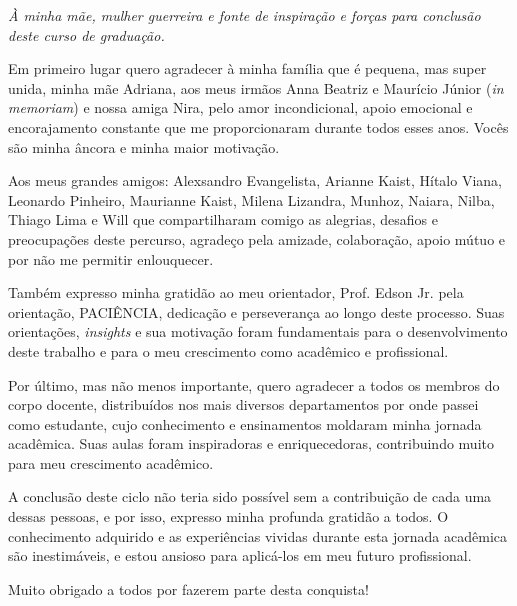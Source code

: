 \documentclass[
	12pt,			%
	openright,		%
	oneside,	
	a4paper,		%
	english,		%
	brazil			%
]{abntex2/abntex2}  %
\begin{document}
	\begin{dedicatoria}
		
		\vspace*{\fill}
		\noindent
		\leftskip=7cm
		\textit{À minha mãe, mulher guerreira e fonte de inspiração e forças para conclusão deste curso de graduação.}
		\vspace{5cm}
	
	\end{dedicatoria}

	\begin{agradecimentos}

		Em primeiro lugar quero agradecer à minha família que é pequena, mas super unida, minha mãe Adriana, aos meus irmãos Anna Beatriz e Maurício Júnior (\textit{in memoriam}) e nossa amiga Nira, pelo amor incondicional, apoio emocional e encorajamento constante que me proporcionaram durante todos esses anos. Vocês são minha âncora e minha maior motivação.
		
		Aos meus grandes amigos: Alexsandro Evangelista, Arianne Kaist, Hítalo Viana, Leonardo Pinheiro, Maurianne Kaist, Milena Lizandra, Munhoz, Naiara, Nilba, Thiago Lima e Will que compartilharam comigo as alegrias, desafios e preocupações deste percurso, agradeço pela amizade, colaboração, apoio mútuo e por não me permitir enlouquecer.
		
		Também expresso minha gratidão ao meu orientador, Prof. Edson Jr. pela orientação, PACIÊNCIA, dedicação e perseverança ao longo deste processo. Suas orientações, \textit{insights} e sua motivação foram fundamentais para o desenvolvimento deste trabalho e para o meu crescimento como acadêmico e profissional.
		
		Por último, mas não menos importante, quero agradecer a todos os membros do corpo docente, distribuídos nos mais diversos departamentos por onde passei como estudante, cujo conhecimento e ensinamentos moldaram minha jornada acadêmica. Suas aulas foram inspiradoras e enriquecedoras, contribuindo muito para meu crescimento acadêmico.
		
		A conclusão deste ciclo não teria sido possível sem a contribuição de cada uma dessas pessoas, e por isso, expresso minha profunda gratidão a todos. O conhecimento adquirido e as experiências vividas durante esta jornada acadêmica são inestimáveis, e estou ansioso para aplicá-los em meu futuro profissional.
		
		Muito obrigado a todos por fazerem parte desta conquista!

	\end{agradecimentos}
\end{document}
